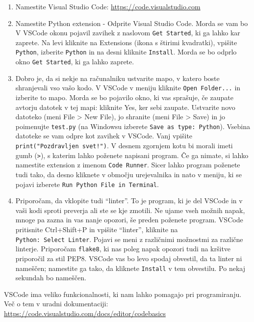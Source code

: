 \documentclass[
]{book}
\providecommand{\tightlist}{%
  \setlength{\itemsep}{0pt}\setlength{\parskip}{0pt}}
\begin{document}
\begin{enumerate}
\def\labelenumi{\arabic{enumi}.}
\setcounter{enumi}{2}
\tightlist
\item
  Namestite Visual Studio Code: \url{https://code.visualstudio.com}
\item
  Namestite Python extension - Odprite Visual Studio Code. Morda se vam bo V
  VSCode okonu pojavil zavihek z naslovom \texttt{Get\ Started}, ki ga lahko kar zaprete.
  Na levi kliknite na Extensions (ikona s štirimi kvadratki), vpišite \texttt{Python},
  izberite \texttt{Python} in na desni kliknite \texttt{Install}. Morda se bo odprlo okno
  \texttt{Get\ Started}, ki ga lahko zaprete.
\item
  Dobro je, da si nekje na računalniku ustvarite mapo, v katero boste shranjevali
  vso vašo kodo. V VSCode v meniju kliknite \texttt{Open\ Folder...} in izberite to mapo.
  Morda se bo pojavilo okno, ki vas sprašuje, če zaupate avtorju datotek
  v tej mapi: kliknite Yes, ker sebi zaupate. Ustvarite novo datoteko
  (meni File \textgreater{} New File), jo shranite (meni File \textgreater{} Save) in jo poimenujte
  \texttt{test.py} (na Windowsu izberete \texttt{Save\ as\ type:\ Python}). Vsebina datoteke se vam
  odpre kot zavihek v VSCode. Vanj vpišite \texttt{print("Pozdravljen\ svet!")}. V desnem
  zgornjem kotu bi morali imeti gumb (\texttt{\textbar{}\textgreater{}}), s katerim lahko poženete napisani program.
  Če ga nimate, si lahko namestite extension z imenom \texttt{Code\ Runner}. Sicer lahko
  program poženete tudi tako, da desno kliknete v območju urejevalnika in nato v
  meniju, ki se pojavi izberete \texttt{Run\ Python\ File\ in\ Terminal}.
\item
  Priporočam, da vklopite tudi ``linter''. To je program, ki je del VSCode in
  v vaši kodi sproti preverja ali ste se kje zmotili. Ne ujame vseh možnih napak,
  mnoge pa zazna in vas nanje opozori, še preden poženete program.
  VSCode pritisnite Ctrl+Shift+P in vpišite ``linter'', kliknite na
  \texttt{Python:\ Select\ Linter}. Pojavi se meni z različnimi možnostmi za različne linterje.
  Priporočam \texttt{flake8}, ki nas poleg napak opozori tudi na kršitve priporočil za stil
  PEP8. VSCode vas bo levo spodaj obvestil, da ta linter ni nameščen;
  namestite ga tako, da kliknete \texttt{Install} v tem obvestilu. Po nekaj sekundah bo nameščen.
\end{enumerate}

VSCode ima veliko funkcionalnosti, ki nam lahko pomagajo pri programiranju.
Več o tem v uradni dokumentaciji: \url{https://code.visualstudio.com/docs/editor/codebasics}
\end{document}
